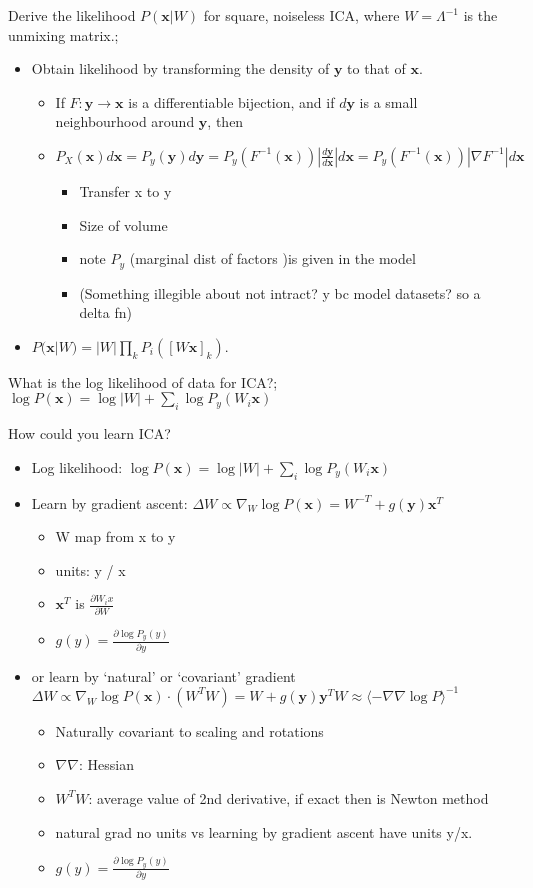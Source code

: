 \documentclass{article}
\begin{document}
Derive the likelihood $P(\mathbf{x}|W)$ for square, noiseless ICA, where $W=\Lambda^{-1}$ is the unmixing matrix.; \begin{itemize} \item Obtain likelihood by transforming the density of $\mathbf{y}$ to that of $\mathbf{x}$. \begin{itemize} \item If $F:\mathbf{y}\to\mathbf{x}$ is a differentiable bijection, and if $d\mathbf{y}$ is a small neighbourhood around $\mathbf{y}$, then \item $P_X(\mathbf{x})d\mathbf{x}=P_y(\mathbf{y})d\mathbf{y}=P_y(F^{-1}(\mathbf{x}))|\frac{d\mathbf{y}}{d\mathbf{x}}|d\mathbf{x}=P_y(F^{-1}(\mathbf{x}))|\nabla F^{-1}|d\mathbf{x}$ \begin{itemize} \item Transfer x to y \item Size of volume  \item note $P_y$ (marginal dist of factors )is given in the model \item (Something illegible about not intract? y bc model datasets? so a delta fn) \end{itemize} \end{itemize} \item $P(\mathbf{x}|W)=|W|\prod_kP_i([W\mathbf{x}]_k)$. \end{itemize}

What is the log likelihood of data for ICA?; $\log P(\mathbf{x})=\log|W|+\sum_i \log P_y(W_i\mathbf{x})$

How could you learn ICA? \begin{itemize} \item Log likelihood: $\log P(\mathbf{x})=\log|W|+\sum_i \log P_y(W_i\mathbf{x})$  \item Learn by gradient ascent: $\Delta W\propto \nabla_W\log P(\mathbf{x}) = W^{-T}+g(\mathbf{y})\mathbf{x}^T$ \begin{itemize} \item W map from x to y \item units: y / x \item $\mathbf{x}^T$ is $\frac{\partial W_ix}{\partial W}$ \item $g(y)=\frac{\partial \log P_y(y)}{\partial y}$ \end{itemize} \item or learn by `natural' or `covariant' gradient $\Delta W\propto \nabla_W\log P(\mathbf{x})\cdot (W^TW) = W + g(\mathbf{y})\mathbf{y}^TW \approx \langle -\nabla\nabla\log P\rangle^{-1}$ \begin{itemize} \item Naturally covariant to scaling and rotations \item $\nabla\nabla$: Hessian \item $W^TW$: average value of 2nd derivative, if exact then is Newton method \item natural grad no units vs learning by gradient ascent have units y/x. \item $g(y)=\frac{\partial \log P_y(y)}{\partial y}$ \end{itemize} \end{itemize}
\end{document}
